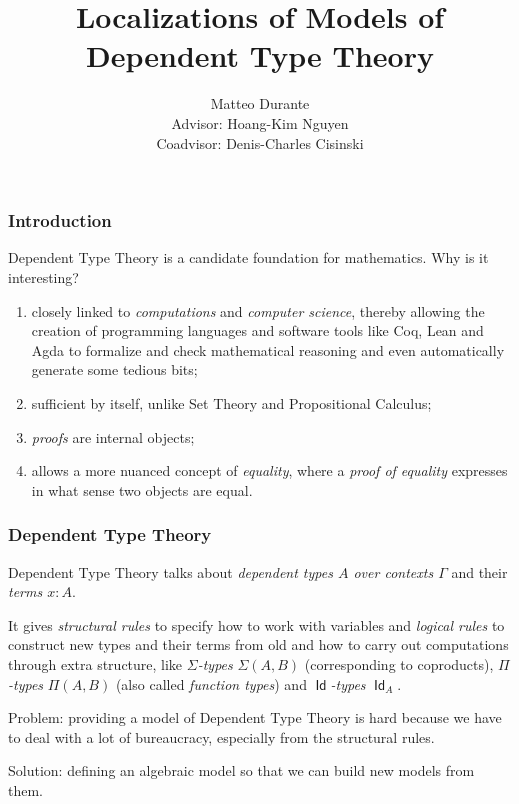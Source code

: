 \documentclass{beamer}
\title{Localizations of Models of Dependent Type Theory}
\author{Matteo Durante \\ Advisor: Hoang-Kim Nguyen \\ Coadvisor: Denis-Charles
Cisinski}
\institute{Regensburg University}
\DeclareMathOperator{\Id}{\mathsf{Id}}
\begin{document}
\newtheorem{thm}{Theorem}[section]
\newtheorem{defn}{Definition}[section]
\newtheorem{conj}{Conjecture}[section]
\newtheorem{lem}{Lemma}[section]

\frame{\titlepage}

\begin{frame}
  \frametitle{Introduction}

  Dependent Type Theory is a candidate foundation for mathematics. Why is it
  interesting?

  \begin{enumerate}
    \item closely linked to \emph{computations} and \emph{computer science},
      thereby allowing the creation of programming languages and software tools
      like Coq, Lean and Agda to formalize and check mathematical reasoning and
      even automatically generate some tedious bits;
    \item sufficient by itself, unlike Set Theory and Propositional Calculus;
    \item \emph{proofs} are internal objects;
    \item allows a more nuanced concept of \emph{equality}, where a \emph{proof of
      equality} expresses in what sense two objects are equal.
  \end{enumerate}
\end{frame}

\begin{frame}
  \frametitle{Dependent Type Theory}
  Dependent Type Theory talks about \emph{dependent types $A$ over contexts
  $\Gamma$} and their \emph{terms $x:A$}.

  It gives \emph{structural rules} to specify how to work with variables and
  \emph{logical rules} to construct new types and their terms
  from old and how to carry out computations
  through extra structure, like \emph{$\Sigma$-types}
  $\Sigma(A,B)$ (corresponding to coproducts), \emph{$\Pi$-types} $\Pi(A,B)$
  (also called \emph{function types}) and \emph{$\Id$-types} $\Id_A$.

  Problem: providing a model of Dependent Type Theory is hard because we have to
  deal with a lot of bureaucracy, especially from the structural rules.

  Solution: defining an algebraic model so that we can build new models from
  them.
\end{frame}
\end{document}
